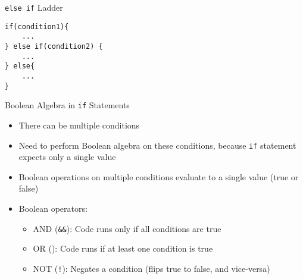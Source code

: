\documentclass[12pt, aspectratio=169]{beamer}
\begin{document}


    \begin{frame}[fragile]{\texttt{else if} Ladder}
        \begin{verbatim}
if(condition1){
    ...
} else if(condition2) {
    ...
} else{
    ...
}
        \end{verbatim}
    \end{frame}




    \begin{frame}{Boolean Algebra in \texttt{if} Statements}
        \begin{itemize}
            \item There can be multiple conditions
            \item Need to perform Boolean algebra on these conditions, because \texttt{if} statement expects only a single value
            \item Boolean operations on multiple conditions evaluate to a single value (true or false)
            \item Boolean operators:
            \begin{itemize}
                \item AND (\texttt{\&\&}): Code runs only if all conditions are true
                \item OR  (\texttt{\vert\vert}): Code runs if at least one condition is true
                \item NOT (\texttt{!}): Negates a condition (flips true to false, and vice-versa)
            \end{itemize}
        \end{itemize}
    \end{frame}


\end{document}

